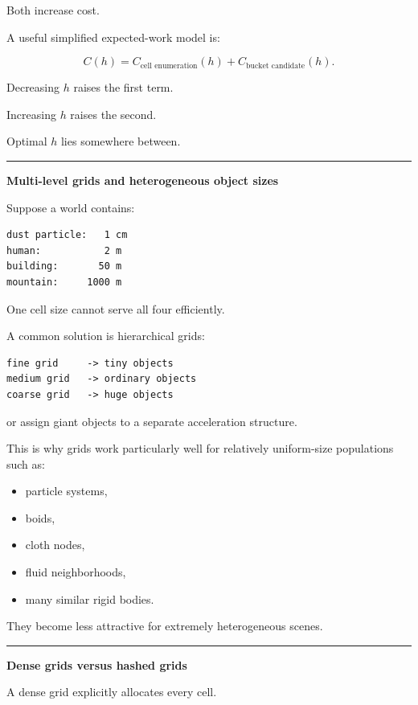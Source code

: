 Both increase cost.

A useful simplified expected-work model is:

\[
C(h)
=
C_{\text{cell enumeration}}(h)
+
C_{\text{bucket candidate}}(h).
\]

Decreasing \(h\) raises the first term.

Increasing \(h\) raises the second.

Optimal \(h\) lies somewhere between.

\begin{center}\rule{0.5\linewidth}{0.5pt}\end{center}

\textbf{Multi-level grids and heterogeneous object sizes}

Suppose a world contains:

\begin{verbatim}
dust particle:   1 cm
human:           2 m
building:       50 m
mountain:     1000 m
\end{verbatim}

One cell size cannot serve all four efficiently.

A common solution is hierarchical grids:

\begin{verbatim}
fine grid     -> tiny objects
medium grid   -> ordinary objects
coarse grid   -> huge objects
\end{verbatim}

or assign giant objects to a separate acceleration structure.

This is why grids work particularly well for relatively uniform-size populations such as:

\begin{itemize}
\tightlist
\item
  particle systems,
\item
  boids,
\item
  cloth nodes,
\item
  fluid neighborhoods,
\item
  many similar rigid bodies.
\end{itemize}

They become less attractive for extremely heterogeneous scenes.

\begin{center}\rule{0.5\linewidth}{0.5pt}\end{center}

\textbf{Dense grids versus hashed grids}

A dense grid explicitly allocates every cell.

